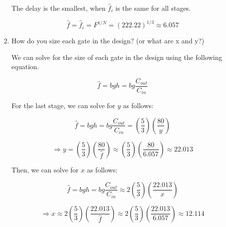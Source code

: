 \documentclass[fleqn]{article}
\begin{document}
\begin{enumerate}
\begin{enumerate}
				The delay is the smallest, when $\hat{f}_i$ is the same for all stages.
				
				\begin{equation*}
					\hat{f} = \hat{f}_i = F^{1/N} = (222.22)^{1/3} \approx \mathbf{6.057}
				\end{equation*}
					
				\item How do you size each gate in the design? (or what are x and y?)
			
				We can solve for the size of each gate in the design using the following equation.
				
				\begin{equation*}
					\hat{f} = bgh = bg\frac{C_{out}}{C_{in}}
				\end{equation*}
				
				For the last stage, we can solve for $y$ as follows:
				
				\begin{equation*}
					\hat{f} = bgh = bg\frac{C_{out}}{C_{in}} = \left(\frac{5}{3}\right)\left(\frac{80}{y}\right)
				\end{equation*}
				
				\begin{equation*}
					 \Rightarrow y = \left(\frac{5}{3}\right)\left(\frac{80}{\hat{f}}\right) \approx \left(\frac{5}{3}\right)\left(\frac{80}{6.057}\right) \approx \mathbf{22.013}
				\end{equation*}
				
				Then, we can solve for $x$ as follows:
				
				\begin{equation*}
					\hat{f} = bgh = bg\frac{C_{out}}{C_{in}} \approx 2\left(\frac{5}{3}\right)\left(\frac{22.013}{x}\right)
				\end{equation*}
				
				\begin{equation*}
					 \Rightarrow x \approx 2\left(\frac{5}{3}\right)\left(\frac{22.013}{\hat{f}}\right) \approx 2\left(\frac{5}{3}\right)\left(\frac{22.013}{6.057}\right) \approx \mathbf{12.114}
				\end{equation*}
			
			\end{enumerate}
	\end{enumerate}
\end{document}
